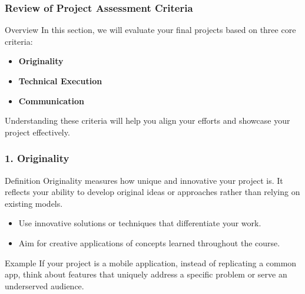 \documentclass[aspectratio=169]{beamer}
\begin{document}
\begin{frame}[fragile]
    \frametitle{Review of Project Assessment Criteria}
    \begin{block}{Overview}
        In this section, we will evaluate your final projects based on three core criteria: 
        \begin{itemize}
            \item \textbf{Originality}
            \item \textbf{Technical Execution}
            \item \textbf{Communication}
        \end{itemize}
        Understanding these criteria will help you align your efforts and showcase your project effectively.
    \end{block}
\end{frame}

\begin{frame}[fragile]
    \frametitle{1. Originality}
    \begin{block}{Definition}
        Originality measures how unique and innovative your project is. It reflects your ability to develop original ideas or approaches rather than relying on existing models.
    \end{block}
    
    \begin{itemize}
        \item Use innovative solutions or techniques that differentiate your work.
        \item Aim for creative applications of concepts learned throughout the course.
    \end{itemize}
    
    \begin{block}{Example}
        If your project is a mobile application, instead of replicating a common app, think about features that uniquely address a specific problem or serve an underserved audience.
    \end{block}
\end{frame}
\end{document}
